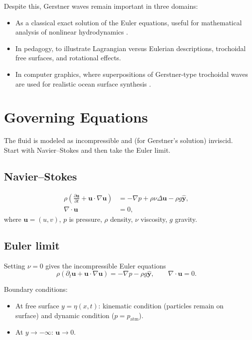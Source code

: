 \documentclass[11pt,letterpaper]{article}
\begin{document}
Despite this, Gerstner waves remain important in three domains:
\begin{itemize}
    \item As a classical exact solution of the Euler equations, useful for mathematical analysis of nonlinear hydrodynamics \cite{craik2004origins,constantin2001gerstner}.
    \item In pedagogy, to illustrate Lagrangian versus Eulerian descriptions, trochoidal free surfaces, and rotational effects.
    \item In computer graphics, where superpositions of Gerstner-type trochoidal waves are used for realistic ocean surface synthesis \cite{tessendorf2001simulating}.
\end{itemize}

\section{Governing Equations}
The fluid is modeled as incompressible and (for Gerstner's solution) inviscid. Start with Navier--Stokes and then take the Euler limit.

\subsection{Navier--Stokes}
\begin{align}
\rho \left( \frac{\partial \mathbf{u}}{\partial t} + \mathbf{u}\cdot\nabla\mathbf{u} \right) 
 &= - \nabla p + \rho \nu \Delta \mathbf{u} - \rho g \hat{\mathbf{y}}, \\
\nabla\cdot \mathbf{u} &= 0,
\end{align}
where $\mathbf{u}=(u,v)$, $p$ is pressure, $\rho$ density, $\nu$ viscosity, $g$ gravity.

\subsection{Euler limit}
Setting $\nu=0$ gives the incompressible Euler equations
\begin{equation}
\rho \left( \partial_t \mathbf{u} + \mathbf{u}\cdot\nabla\mathbf{u} \right) = - \nabla p - \rho g \hat{\mathbf{y}}, 
\qquad \nabla \cdot \mathbf{u} = 0.
\end{equation}

Boundary conditions:
\begin{itemize}
\item At free surface $y=\eta(x,t)$: kinematic condition (particles remain on surface) and dynamic condition ($p=p_{\mathrm{atm}}$).
\item At $y\to -\infty$: $\mathbf{u}\to 0$.
\end{itemize}
\end{document}
